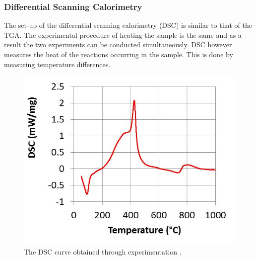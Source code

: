 \subsubsection{Differential Scanning Calorimetry}
The set-up of the differential scanning calorimetry (DSC) is similar to that of the TGA. The experimental procedure of heating the sample is the same and as a result the two experiments can be conducted simultaneously. DSC however measures the heat of the reactions occurring in the sample. This is done by measuring temperature differences\cite{thermal}.\\  
\begin{figure}
\centering
\includegraphics[scale=1]{figures/DSC_exp.jpg}
\caption{The DSC curve obtained through experimentation \cite{Ray19}.}
\label{DSC_exp}
\end{figure} 

